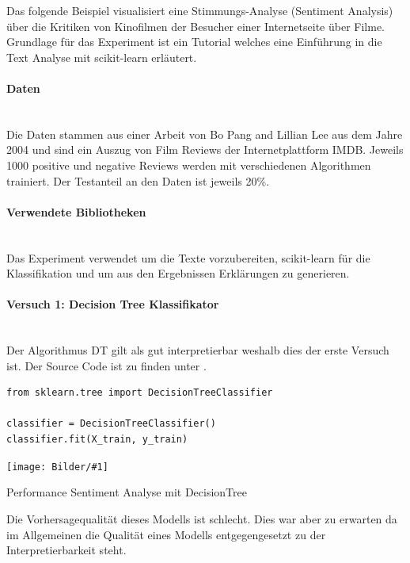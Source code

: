 \documentclass[
  12pt, %
  a4paper, %
  oneside, %
  openany, 
  numbers=noenddot, %
  BCOR=5mm, %
  parskip=half*, %
  thesis, %
]{bfhbook}
\newcommand{\parag}[1]{\paragraph*{#1}\mbox{}\\}
\newcommand{\imgText}[3]{
\begin{center}
    \begin{minipage}[t]{0.6\textwidth}
    		\vspace{0pt}
		\texttt{[image: Bilder/\#1]}
		\caption{#2}
	\end{minipage}\hfill
    \begin{minipage}[t]{0.4\textwidth}
    		\vspace{5pt}
  		#3
    \end{minipage}
\end{center}
}
\begin{document}
Das folgende Beispiel visualisiert eine Stimmungs-Analyse (Sentiment Analysis) über die Kritiken von Kinofilmen der Besucher einer Internetseite über Filme. Grundlage für das Experiment ist ein Tutorial \cite{movieReview} welches eine Einführung in die Text Analyse mit scikit-learn erläutert. 

\parag{Daten}
Die Daten stammen aus einer Arbeit von Bo Pang and Lillian Lee \parencite{Pang+Lee2004} aus dem Jahre 2004 und sind ein Auszug von Film Reviews der Internetplattform IMDB. Jeweils 1000 positive und negative Reviews werden mit verschiedenen Algorithmen trainiert. Der Testanteil an den Daten ist jeweils 20\%.

\parag{Verwendete Bibliotheken}
Das Experiment verwendet \cite{nltk} um die Texte vorzubereiten, scikit-learn \cite{scikit-learnLink} für die Klassifikation und \cite{ELI5} um aus den Ergebnissen Erklärungen zu generieren. 

\parag{Versuch 1: Decision Tree Klassifikator}
Der Algorithmus \Gls{DT} gilt als gut interpretierbar weshalb dies der erste Versuch ist. Der Source Code ist zu finden unter \cite{textClassDT}.
\begin{lstlisting}
from sklearn.tree import DecisionTreeClassifier

classifier = DecisionTreeClassifier()
classifier.fit(X_train, y_train)
\end{lstlisting}

\imgText{MovieReview-DT-Accuracy.PNG}{Performance Sentiment Analyse mit DecisionTree}{
Die Vorhersagequalität dieses Modells ist schlecht. Dies war aber zu erwarten da im Allgemeinen die Qualität eines Modells entgegengesetzt zu der Interpretierbarkeit steht.
}
\end{document}
